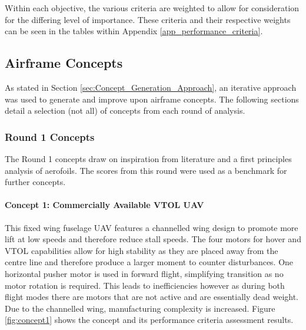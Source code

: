 Within each objective, the various criteria are weighted to allow for consideration for the differing level of importance. These criteria and their respective weights can be seen in the tables within Appendix \ref{app_performance_criteria}.


\subsection{Airframe Concepts}

As stated in Section \ref{sec:Concept_Generation_Approach}, an iterative approach was used to generate and improve upon airframe concepts. The following sections detail a selection (not all) of concepts from each round of analysis. 

\subsubsection{Round 1 Concepts}

The Round 1 concepts draw on inspiration from literature and a first principles analysis of aerofoils. The scores from this round were used as a benchmark for further concepts. 

\paragraph{Concept 1: Commercially Available VTOL UAV}
This fixed wing fuselage UAV features a channelled wing design to promote more lift at low speeds and therefore reduce stall speeds. The four motors for hover and VTOL capabilities allow for high stability as they are placed away from the centre line and therefore produce a larger moment to counter disturbances. One horizontal pusher motor is used in forward flight, simplifying transition as no motor rotation is required. This leads to inefficiencies however as during both flight modes there are motors that are not active and are essentially dead weight. Due to the channelled wing, manufacturing complexity is increased. Figure \ref{fig:concept1} shows the concept and its performance criteria assessment results. 



